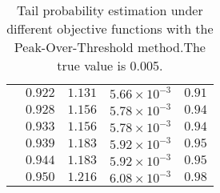 \begin{table}[ht]
{\begin{tabular}{cc|ccc}
&$0.922$ & $1.131$ & $5.66\times 10^{-3}$ & $0.91$\\
&$0.928$ & $1.156$ & $5.78\times 10^{-3}$ & $0.94$\\
&$0.933$ & $1.156$ & $5.78\times 10^{-3}$ & $0.94$\\
&$0.939$ & $1.183$ & $5.92\times 10^{-3}$ & $0.95$\\
&$0.944$ & $1.183$ & $5.92\times 10^{-3}$ & $0.95$\\
&$0.950$ & $1.216$ & $6.08\times 10^{-3}$ & $0.98$\\
    \hline
    \bottomrule
    \end{tabular}}\caption{Tail probability estimation under different objective functions with the Peak-Over-Threshold method.The true value is 0.005.}
    \label{tb5_tpe}
\end{table}